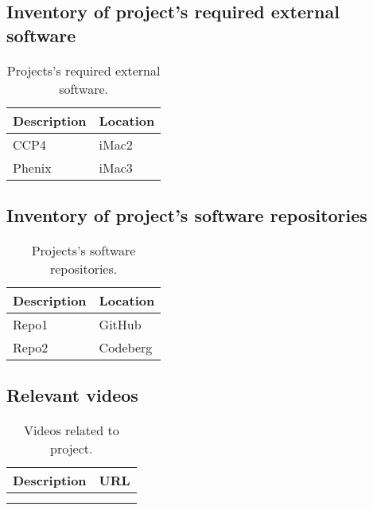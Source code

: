 \documentclass[11pt,letterpaper]{article}
\begin{document}
\subsection{Inventory of project's required external software}
\label{sec:org96c787b}


\begin{table}[htbp]
\caption[External software]{Projects's required external software.}
\centering
\begin{tabular}{ll}
Description & Location\\[0pt]
\hline
CCP4 & iMac2\\[0pt]
Phenix & iMac3\\[0pt]
\end{tabular}
\end{table}



\subsection{Inventory of project's software repositories}
\label{sec:org1111ee8}


\begin{table}[htbp]
\caption[Software repos]{Projects's software repositories.}
\centering
\begin{tabular}{ll}
Description & Location\\[0pt]
\hline
Repo1 & GitHub\\[0pt]
Repo2 & Codeberg\\[0pt]
\end{tabular}
\end{table}



\subsection{Relevant videos}
\label{sec:orge89ce54}

\begin{table}[htbp]
\caption[Related videos]{Videos related to project.}
\centering
\begin{tabular}{ll}
Description & URL\\[0pt]
\hline
 & \\[0pt]
 & \\[0pt]
\end{tabular}
\end{table}
\end{document}
